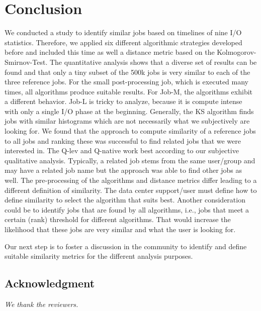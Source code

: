 \documentclass{jhps}
\begin{document}
\section{Conclusion}%
\label{sec:summary}

We conducted a study to identify similar jobs based on timelines of nine I/O statistics.
Therefore, we applied six different algorithmic strategies developed before and included this time as well a distance metric based on the Kolmogorov-Smirnov-Test.
The quantitative analysis shows that a diverse set of results can be found and that only a tiny subset of the 500k jobs is very similar to each of the three reference jobs.
For the small post-processing job, which is executed many times, all algorithms produce suitable results.
For Job-M, the algorithms exhibit a different behavior.
Job-L is tricky to analyze, because it is compute intense with only a single I/O phase at the beginning.
Generally, the KS algorithm finds jobs with similar histograms which are not necessarily what we subjectively are looking for.
We found that the approach to compute similarity of a reference jobs to all jobs and ranking these was successful to find related jobs that we were interested in.
The Q-lev and Q-native work best according to our subjective qualitative analysis.
Typically, a related job stems from the same user/group and may have a related job name but the approach was able to find other jobs as well.
The pre-processing of the algorithms and distance metrics differ leading to a different definition of similarity.
The data center support/user must define how to define similarity to select the algorithm that suits best.
Another consideration could be to identify jobs that are found by all algorithms, i.e., jobs that meet a certain (rank) threshold for different algorithms.
That would increase the likelihood that these jobs are very similar and what the user is looking for.

Our next step is to foster a discussion in the community to identify and define suitable similarity metrics for the different analysis purposes.



\subsection*{Acknowledgment} %
\textit{We thank the reviewers.}


\end{document}
